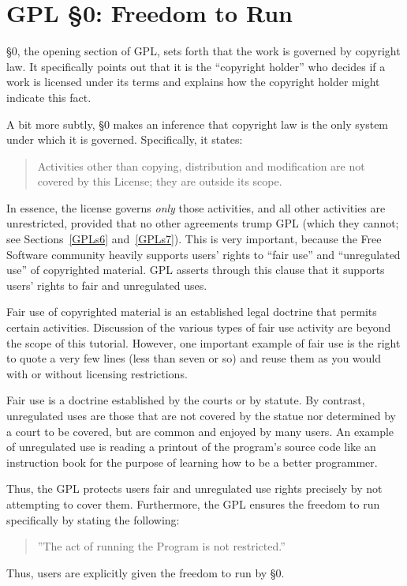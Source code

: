 \documentclass[11pt, letterpaper]{book}
\begin{document}
\section{GPL \S 0: Freedom to Run}
\label{GPLs0}

\S 0, the opening section of GPL, sets forth that the work is governed by
copyright law. It specifically points out that it is the ``copyright
holder'' who decides if a work is licensed under its terms and explains
how the copyright holder might indicate this fact.

A bit more subtly, \S 0 makes an inference that copyright law is the only
system under which it is governed. Specifically, it states:
\begin{quote}
Activities other than copying, distribution and modification are not
covered by this License; they are outside its scope.
\end{quote}
In essence, the license governs \emph{only} those activities, and all other
activities are unrestricted, provided that no other agreements trump GPL
(which they cannot; see Sections~\ref{GPLs6} and~\ref{GPLs7}). This is
very important, because the Free Software community heavily supports
users' rights to ``fair use'' and ``unregulated use'' of copyrighted
material. GPL asserts through this clause that it supports users' rights
to fair and unregulated uses.

Fair use of copyrighted material is an established legal doctrine that
permits certain activities. Discussion of the various types of fair
use activity are beyond the scope of this tutorial. However, one
important example of fair use is the right to quote a very few lines
(less than seven or so) and reuse them as you would with or without
licensing restrictions.

Fair use is a doctrine established by the courts or by statute. By
contrast, unregulated uses are those that are not covered by the statue
nor determined by a court to be covered, but are common and enjoyed by
many users. An example of unregulated use is reading a printout of the
program's source code like an instruction book for the purpose of learning
how to be a better programmer.

\medskip

Thus, the GPL protects users fair and unregulated use rights precisely by
not attempting to cover them. Furthermore, the GPL ensures the freedom
to run specifically by stating the following:
\begin{quote}
''The act of running the Program is not restricted.''
\end{quote}
Thus, users are explicitly given the freedom to run by \S 0.
\end{document}
